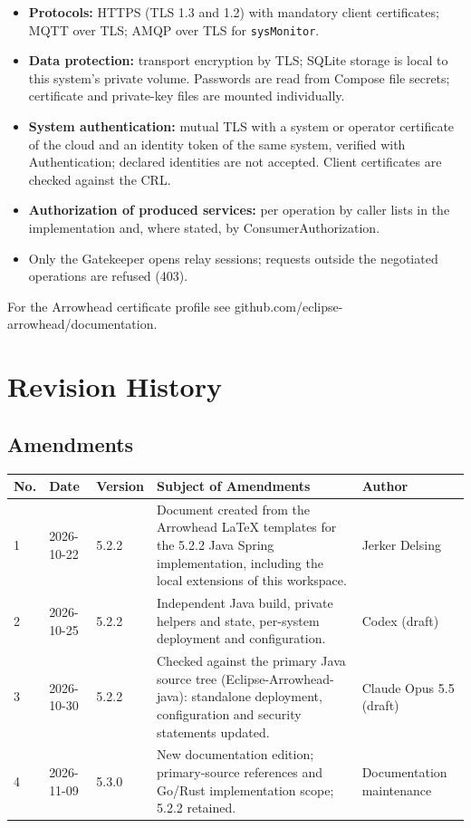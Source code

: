 \documentclass[a4paper]{arrowhead}
\begin{document}
\begin{itemize}
  \item \textbf{Protocols:} HTTPS (TLS 1.3 and 1.2) with mandatory client certificates; MQTT over TLS; AMQP over TLS for \texttt{sysMonitor}.
  \item \textbf{Data protection:} transport encryption by TLS; SQLite storage is local to this system's private volume. Passwords are read from Compose file secrets; certificate and private-key files are mounted individually.
  \item \textbf{System authentication:} mutual TLS with a system or operator certificate of the cloud and an identity token of the same system, verified with Authentication; declared identities are not accepted. Client certificates are checked against the CRL.
  \item \textbf{Authorization of produced services:} per operation by caller lists in the implementation and, where stated, by ConsumerAuthorization.
  \item Only the Gatekeeper opens relay sessions; requests outside the negotiated operations are refused (403).
\end{itemize}

For the Arrowhead certificate profile see github.com/eclipse-arrowhead/documentation.





\newpage

\section{Revision History}
\subsection{Amendments}

\noindent\begin{tabularx}{\textwidth}{| p{1cm} | p{3cm} | p{2cm} | X | p{4cm} |} \hline
\rowcolor{gray!33} No. & Date & Version & Subject of Amendments & Author \\ \hline

1 & 2026-10-22 & 5.2.2 & Document created from the Arrowhead LaTeX templates for the 5.2.2 Java Spring implementation, including the local extensions of this workspace. & Jerker Delsing \\ \hline
2 & 2026-10-25 & 5.2.2 & Independent Java build, private helpers and state, per-system deployment and configuration. & Codex (draft) \\ \hline
3 & 2026-10-30 & 5.2.2 & Checked against the primary Java source tree (Eclipse-Arrowhead-java): standalone deployment, configuration and security statements updated. & Claude Opus 5.5 (draft) \\ \hline
4 & 2026-11-09 & 5.3.0 & New documentation edition; primary-source references and Go/Rust implementation scope; 5.2.2 retained. & Documentation maintenance \\ \hline
\end{tabularx}
\end{document}
